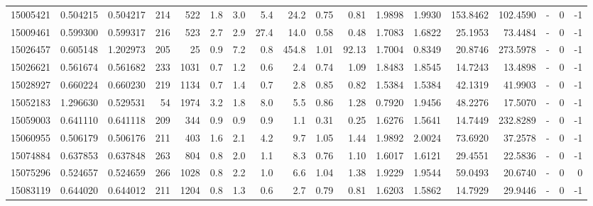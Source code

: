 \begin{tabular}{rrrrrrrrrrrrrrrlrr}
  15005421 & 0.504215 &   0.504217 &  214 &  522 &      1.8 &      3.0 &     5.4 &     24.2 &       0.75 &        0.81 &  1.9898 &  1.9930 &  153.8462 &  102.4590 &             - &        0 &         -1 \\
  15009461 & 0.599300 &   0.599317 &  216 &  523 &      2.7 &      2.9 &    27.4 &     14.0 &       0.58 &        0.48 &  1.7083 &  1.6822 &   25.1953 &   73.4484 &             - &        0 &         -1 \\
  15026457 & 0.605148 &   1.202973 &  205 &   25 &      0.9 &      7.2 &     0.8 &    454.8 &       1.01 &       92.13 &  1.7004 &  0.8349 &   20.8746 &  273.5978 &             - &        0 &         -1 \\
  15026621 & 0.561674 &   0.561682 &  233 & 1031 &      0.7 &      1.2 &     0.6 &      2.4 &       0.74 &        1.09 &  1.8483 &  1.8545 &   14.7243 &   13.4898 &             - &        0 &         -1 \\
  15028927 & 0.660224 &   0.660230 &  219 & 1134 &      0.7 &      1.4 &     0.7 &      2.8 &       0.85 &        0.82 &  1.5384 &  1.5384 &   42.1319 &   41.9903 &             - &        0 &         -1 \\
  15052183 & 1.296630 &   0.529531 &   54 & 1974 &      3.2 &      1.8 &     8.0 &      5.5 &       0.86 &        1.28 &  0.7920 &  1.9456 &   48.2276 &   17.5070 &             - &        0 &         -1 \\
  15059003 & 0.641110 &   0.641118 &  209 &  344 &      0.9 &      0.9 &     0.9 &      1.1 &       0.31 &        0.25 &  1.6276 &  1.5641 &   14.7449 &  232.8289 &             - &        0 &         -1 \\
  15060955 & 0.506179 &   0.506176 &  211 &  403 &      1.6 &      2.1 &     4.2 &      9.7 &       1.05 &        1.44 &  1.9892 &  2.0024 &   73.6920 &   37.2578 &             - &        0 &         -1 \\
  15074884 & 0.637853 &   0.637848 &  263 &  804 &      0.8 &      2.0 &     1.1 &      8.3 &       0.76 &        1.10 &  1.6017 &  1.6121 &   29.4551 &   22.5836 &             - &        0 &         -1 \\
  15075296 & 0.524657 &   0.524659 &  266 & 1028 &      0.8 &      2.2 &     1.0 &      6.6 &       1.04 &        1.38 &  1.9229 &  1.9544 &   59.0493 &   20.6740 &             - &        0 &          0 \\
  15083119 & 0.644020 &   0.644012 &  211 & 1204 &      0.8 &      1.3 &     0.6 &      2.7 &       0.79 &        0.81 &  1.6203 &  1.5862 &   14.7929 &   29.9446 &             - &        0 &         -1 \\

\end{tabular}
